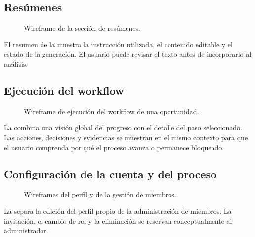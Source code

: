 \subsection{Resúmenes}

\begin{figure}[H]
  \centering
  \resizebox{\textwidth}{!}{
    
  }
  \caption{Wireframe de la sección de resúmenes.}
  \label{fig:wireframe-qualification-summaries}
\end{figure}

El resumen de la  muestra la
instrucción utilizada, el contenido editable y el estado de la generación. El
usuario puede revisar el texto antes de incorporarlo al análisis.

\subsection{Ejecución del workflow}

\begin{figure}[H]
  \centering
  \resizebox{\textwidth}{!}{
    
  }
  \caption{Wireframe de ejecución del workflow de una oportunidad.}
  \label{fig:wireframe-qualification-workflow}
\end{figure}

La  combina una visión global del
progreso con el detalle del paso seleccionado. Las acciones, decisiones y
evidencias se muestran en el mismo contexto para que el usuario comprenda por
qué el proceso avanza o permanece bloqueado.

\subsection{Configuración de la cuenta y del proceso}

\begin{figure}[H]
  \centering
  \resizebox{\textwidth}{!}{
    
  }
  \caption{Wireframes del perfil y de la gestión de miembros.}
  \label{fig:wireframes-account-profile}
\end{figure}

La  separa la edición del perfil propio de
la administración de miembros. La invitación, el cambio de rol y la eliminación
se reservan conceptualmente al administrador.

